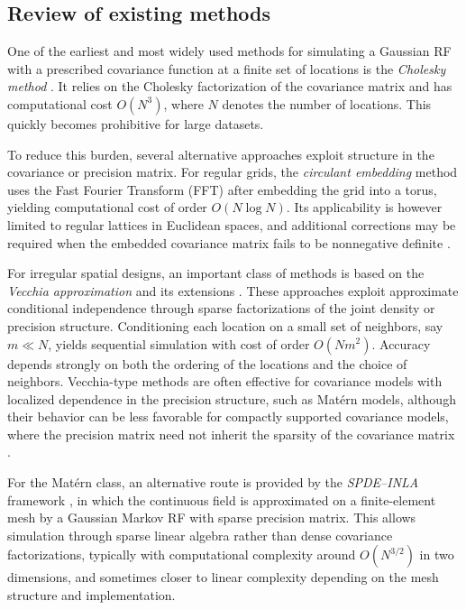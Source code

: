 \documentclass[
  12pt]{article}
\begin{document}
\subsection{Review of existing methods}

One of the earliest and most widely used methods for simulating a Gaussian RF with a prescribed covariance function at a finite set of locations is the \emph{Cholesky method} \citep{Ripley:1987}.
It relies on the Cholesky factorization of the covariance matrix and has computational cost $O(N^3)$, where $N$ denotes the number of locations.
This quickly becomes prohibitive for large datasets.

To reduce this burden, several alternative approaches exploit structure in the covariance or precision matrix.
For regular grids, the \emph{circulant embedding} method \citep{Dietrich-Newsam:1993,chan1997algorithm} uses the Fast Fourier Transform (FFT) after embedding the grid into a torus, yielding computational cost of order $O(N\log N)$.
Its applicability is however limited to regular lattices in Euclidean spaces, and additional corrections may be required when the embedded covariance matrix fails to be nonnegative definite \citep{Chiles2012}.

For irregular spatial designs, an important class of methods is based on the \emph{Vecchia approximation} \citep{vecchia1988} and its extensions \citep{datta2016a,katzfuss2017general}.
These approaches exploit approximate conditional independence through sparse factorizations of the joint density or precision structure.
Conditioning each location on a small set of neighbors, say $m\ll N$, yields sequential simulation with cost of order $O(Nm^2)$.
Accuracy depends strongly on both the ordering of the locations and the choice of neighbors.
Vecchia-type methods are often effective for covariance models with localized dependence in the precision structure, such as Mat\'ern models, although their behavior can be less favorable for compactly supported covariance models, where the precision matrix need not inherit the sparsity of the covariance matrix \citep{mateporcu}.

For the Mat\'ern class, an alternative route is provided by the \emph{SPDE--INLA} framework \citep{Lindgren:Rue:Lindstrom:2011}, in which the continuous field is approximated on a finite-element mesh by a Gaussian Markov RF with sparse precision matrix.
This allows simulation through sparse linear algebra rather than dense covariance factorizations, typically with computational complexity around $O(N^{3/2})$ in two dimensions, and sometimes closer to linear complexity depending on the mesh structure and implementation.
\end{document}
